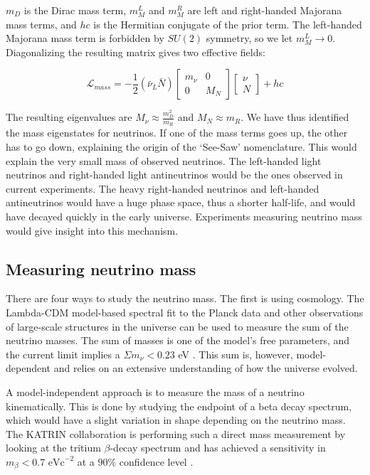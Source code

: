 $m_D$ is the Dirac mass term, $m_M^L$ and $m_M^R$ are left and right-handed Majorana mass terms, and $hc$ is the Hermitian conjugate of the prior term. The left-handed Majorana mass term is forbidden by $SU (2)$ symmetry, so we let $m_M^L \rightarrow 0$. Diagonalizing the resulting matrix gives two effective fields: 

\begin{equation}\label{mass_lagrangian_reduced}
\mathcal{L}_{mass} = -\frac{1}{2}(\bar{\nu}_L\bar{N}) \begin{bmatrix} m_\nu & 0 \\ 0 & M_N \end{bmatrix} \begin{bmatrix} \nu \\ N \end{bmatrix} + hc
\end{equation}

The resulting eigenvalues are $M_\nu \approx \frac{m^2_D}{m_R}$ and $M_N \approx m_R$. We have thus identified the mass eigenstates for neutrinos. If one of the mass terms goes up, the other has to go down, explaining the origin of the `See-Saw' nomenclature. This would explain the very small mass of observed neutrinos. The left-handed light neutrinos and right-handed light antineutrinos would be the ones observed in current experiments. The heavy right-handed neutrinos and left-handed antineutrinos would have a huge phase space, thus a shorter half-life, and would have decayed quickly in the early universe. Experiments measuring neutrino mass would give insight into this mechanism. 

\subsection{Measuring neutrino mass}

There are four ways to study the neutrino mass. The first is using cosmology. The Lambda-CDM model-based spectral fit to the Planck data and other observations of large-scale structures in the universe can be used to measure the sum of the neutrino masses. The sum of masses is one of the model's free parameters, and the current limit implies a $\Sigma m_\nu<0.23$ eV \cite{Planck_2015fie}. This sum is, however, model-dependent and relies on an extensive understanding of how the universe evolved. 

A model-independent approach is to measure the mass of a neutrino kinematically. This is done by studying the endpoint of a beta decay spectrum, which would have a slight variation in shape depending on the neutrino mass. The KATRIN collaboration is performing such a direct mass measurement by looking at the tritium $\beta$-decay spectrum and has achieved a sensitivity in $m_\beta < 0.7 \text{ eVc}^{-2}$ at a $90\%$ confidence level \cite{KATRIN:2022}.

